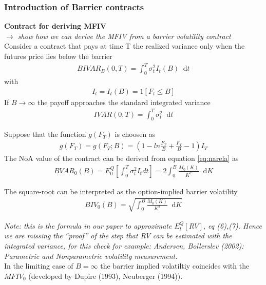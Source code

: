 \documentclass{article}
\newcommand*\diff{\mathop{}\!\mathrm{d}}
\begin{document}
\subsubsection{Introduction of Barrier contracts}

\textbf{Contract for deriving MFIV}\\
\textit{$\rightarrow$ show how we can derive the MFIV from a barrier volatility contract}\\

Consider a contract that pays at time T the realized variance only when the futures price lies below the barrier
\begin{align*}
BIVAR_{B}(0,T) = \int_{0}^{T} \sigma_{t}^{2} I_{t}(B) \diff t
\end{align*}
with 
\begin{align*}
I_{t} = I_{t}(B) = 1[F_{t} \leq B]
\end{align*}
If $B \rightarrow \infty$ the payoff approaches the standard integrated variance
\begin{align*}
IV AR(0,T) = \int_{0}^{T} \sigma_{t}^{2} \diff t
\end{align*}

Suppose that the function $g(F_{T})$ is choosen as
\begin{align*}
g(F_{T}) = g(F_{T};B) = \left (1 - ln\frac{F_{T}}{B} + \frac{F_{T}}{B} - 1 \right) I_{T}
\end{align*}
The NoA value of the contract can be derived from equation \ref{eq:narela} as
\begin{align*}
BV AR_{0}(B) = E_{0}^{Q} \left [\int_{0}^{T} \sigma_{t}^{2} I_{t} dt \right] = 2 \int_{0}^{B} \frac{M_{0}(K)}{K^{2}} \diff K
\end{align*}

The square-root can be interpreted as the option-implied barrier volatility
\begin{align*}
BIV_{0}(B) = \sqrt{\int_{0}^{B} \frac{M_{0}(K)}{K^{2}} \diff K}
\end{align*}

\textit{Note: this is the formula in our paper to approximate $E_{t}^{Q}[RV]$, eq (6),(7). Hence we are missing the ``proof'' of the step that RV can be estimated with the integrated variance, for this check for example: Andersen, Bollerslev (2002): Parametric and Nonparametric volatility measurement.}\\

In the limiting case of $B = \infty$ the barrier implied volatiltiy coincides with the $MFIV_{0}$ (developed by Dupire (1993), Neuberger (1994)).\\
\end{document}
